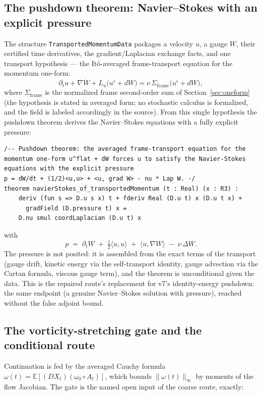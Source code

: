 \documentclass[11pt]{article}
\theoremstyle{definition}
\begin{document}
\subsection{The pushdown theorem: Navier--Stokes with an explicit pressure}
\label{sec:pushdown}

The structure \texttt{TransportedMomentumData} packages a velocity $u$, a
gauge $W$, their certified time derivatives, the gradient/Laplacian exchange
facts, and one transport hypothesis --- the It\^o-averaged frame-transport
equation for the momentum one-form:
\[
  \partial_t u + \nabla \dot W
    + L_u\bigl(u^\flat + dW\bigr)
  = \nu \,\Sigma_{\mathrm{frame}}\bigl(u^\flat + dW\bigr),
\]
where $\Sigma_{\mathrm{frame}}$ is the normalized frame second-order sum of
Section~\ref{sec:oneform} (the hypothesis is stated in averaged form; no
stochastic calculus is formalized, and the field is labeled accordingly in
the source).  From this single hypothesis the pushdown theorem derives the
Navier--Stokes equations with a fully explicit pressure:

\begin{lstlisting}[language={}]
/-- Pushdown theorem: the averaged frame-transport equation for the
momentum one-form u^flat + dW forces u to satisfy the Navier-Stokes
equations with the explicit pressure
p = dW/dt + (1/2)<u,u> + <u, grad W> - nu * Lap W. -/
theorem navierStokes_of_transportedMomentum (t : Real) (x : R3) :
    deriv (fun s => D.u s x) t + fderiv Real (D.u t) x (D.u t x) +
      gradField (D.pressure t) x =
    D.nu smul coordLaplacian (D.u t) x
\end{lstlisting}

with
\[
  p \;=\; \partial_t W \;+\; \tfrac12\langle u,u\rangle
      \;+\; \langle u,\nabla W\rangle \;-\; \nu\,\Delta W .
\]
The pressure is not posited: it is assembled from the exact terms of the
transport (gauge drift, kinetic energy via the self-transport identity, gauge
advection via the Cartan formula, viscous gauge term), and the theorem is
unconditional given the data.  This is the repaired route's replacement for
v7's identity-energy pushdown: the same endpoint (a genuine Navier--Stokes
solution with pressure), reached without the false adjoint bound.

\subsection{The vorticity-stretching gate and the conditional route}
\label{sec:gate}

Continuation is fed by the averaged Cauchy formula
$\omega(t)=\mathbb{E}[(DX_t)(\omega_0\circ A_t)]$, which bounds
$\|\omega(t)\|_\infty$ by moments of the flow Jacobian.  The gate is the
named open input of the coarse route, exactly:
\end{document}
